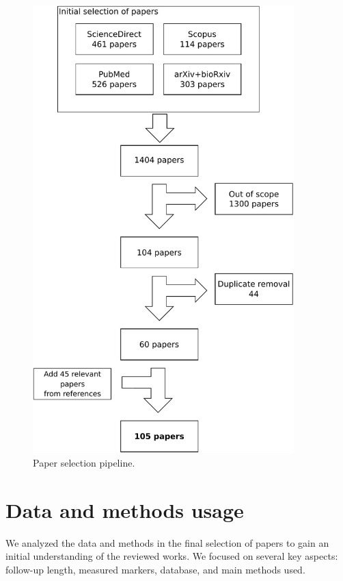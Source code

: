 \begin{figure}[!htbp]
  \centering
  \includegraphics[width=0.9\textwidth,height=0.9\textheight,keepaspectratio]{figures/review/Fig1.pdf}
  \caption{Paper selection pipeline.}
  \label{fig:search}
\end{figure}

\section{Data and methods usage}
\label{sec:longdata}

We analyzed the data and methods in the final selection of papers to gain an initial understanding of the reviewed works. We focused on several key aspects: follow-up length, measured markers, database, and main methods used. \\


